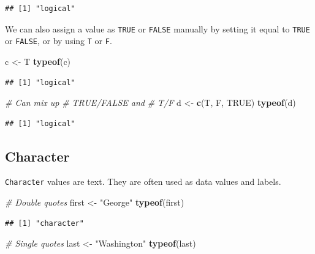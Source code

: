 \documentclass[
]{book}
\newenvironment{Shaded}{\begin{snugshade}}{\end{snugshade}}
\newcommand{\CommentTok}[1]{\textcolor[rgb]{0.56,0.35,0.01}{\textit{#1}}}
\newcommand{\KeywordTok}[1]{\textcolor[rgb]{0.13,0.29,0.53}{\textbf{#1}}}
\newcommand{\NormalTok}[1]{#1}
\newcommand{\OtherTok}[1]{\textcolor[rgb]{0.56,0.35,0.01}{#1}}
\newcommand{\StringTok}[1]{\textcolor[rgb]{0.31,0.60,0.02}{#1}}
\begin{document}
\begin{verbatim}
## [1] "logical"
\end{verbatim}

We can also assign a value as \texttt{TRUE} or \texttt{FALSE} manually by setting it equal to \texttt{TRUE} or \texttt{FALSE}, or by using \texttt{T} or \texttt{F}.

\begin{Shaded}
\begin{Highlighting}[]
\NormalTok{c <-}\StringTok{ }\NormalTok{T}
\KeywordTok{typeof}\NormalTok{(c)}
\end{Highlighting}
\end{Shaded}

\begin{verbatim}
## [1] "logical"
\end{verbatim}

\begin{Shaded}
\begin{Highlighting}[]
\CommentTok{# Can mix up}
\CommentTok{# TRUE/FALSE and}
\CommentTok{# T/F}
\NormalTok{d <-}\StringTok{ }\KeywordTok{c}\NormalTok{(T, F, }\OtherTok{TRUE}\NormalTok{)}
\KeywordTok{typeof}\NormalTok{(d)}
\end{Highlighting}
\end{Shaded}

\begin{verbatim}
## [1] "logical"
\end{verbatim}

\hypertarget{character}{%
\subsection*{Character}\label{character}}

\texttt{Character} values are text. They are often used as data values and labels.

\begin{Shaded}
\begin{Highlighting}[]
\CommentTok{# Double quotes}
\NormalTok{first <-}\StringTok{ "George"}
\KeywordTok{typeof}\NormalTok{(first)}
\end{Highlighting}
\end{Shaded}

\begin{verbatim}
## [1] "character"
\end{verbatim}

\begin{Shaded}
\begin{Highlighting}[]
\CommentTok{# Single quotes}
\NormalTok{last <-}\StringTok{ "Washington"}
\KeywordTok{typeof}\NormalTok{(last)}
\end{Highlighting}
\end{Shaded}
\end{document}
